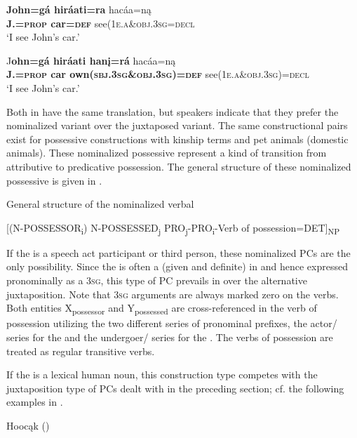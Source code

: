 \documentclass[output=paper]{LSP/langsci}
\begin{document}
\ea 
\gll \textbf{John=g\'a hir\'aati=ra}  hac\'aa=n\k{a} \\
\textbf{J.=\textsc{prop} car=\textsc{def}} see(\textsc{1e.a}\&\textsc{obj.3sg}=\textsc{decl} \\
\glt `I see John's car.'  

\ex 
\gll J\textbf{ohn=g\'a hir\'aati han\k{i}=r\'a} hac\'aa=n\k{a}  \\
\textbf{J.=\textsc{prop} car own(\textsc{sbj.3sg}\&\textsc{obj.3sg})=\textsc{def}} see(\textsc{1e.a}\&\textsc{obj.3sg})=\textsc{decl}  \\
\glt `I see John's car.'
\z
\z 

Both  in  have the same translation, but speakers indicate that they prefer the nominalized variant over the juxtaposed variant. The same constructional pairs exist for possessive constructions with kinship terms and pet animals (domestic animals). These nominalized possessive  represent a kind of transition from attributive to predicative possession. The general structure of these nominalized possessive  is given in .

\ea General structure of the nominalized verbal  \label{generalstructure}

[(N-POSSESSOR\textsubscript{i})  N-POSSESSED\textsubscript{j}    PRO\textsubscript{j}-PRO\textsubscript{i}-Verb of possession=DET]\textsubscript{NP}
\z

If the  is a speech act participant or third person, these nominalized PCs are the only possibility. Since the  is often a  (given and definite) in  and hence expressed pronominally as a \textsc{3sg}, this type of PC prevails in  over the alternative juxtaposition. Note that \textsc{3sg} arguments are always marked zero on the verbs. Both entities X\textsubscript{possessor} and Y\textsubscript{possessed} are cross-referenced in the verb of possession utilizing the two different series of pronominal prefixes, the actor/ series for the  and the undergoer/ series for the . The verbs of possession are treated as regular transitive verbs.

If the  is a lexical human noun, this construction type competes with the juxtaposition type of PCs dealt with in the preceding section; cf. the following examples in .
 
\ea {}Hoocąk (\citealt[16]{Helmbrecht2003}) \label{petersthings}
\end{document}

